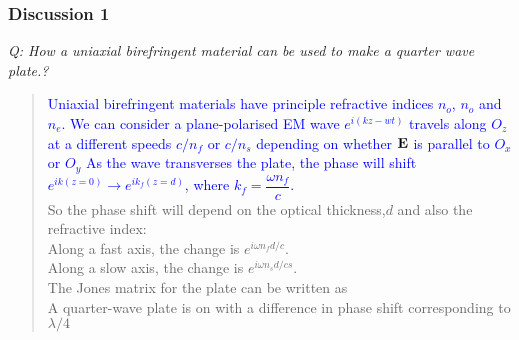 \documentclass[12pt,a4paper]{article}
\begin{document}
\subsubsection{Discussion 1}
    \textit{Q: How a uniaxial birefringent material can be used to make a quarter wave plate.?}\\
    \begin{quote}
    \textcolor{blue}{
    Uniaxial birefringent materials have principle refractive indices $n_o$, $n_o$ and $n_e$. 
    We can consider a plane-polarised EM wave $e^{i(kz-wt)}$ travels along $O_z$
    at a different speeds $c/n_f$ or $c/n_s$ depending on whether $\vb{E}$ is parallel to $O_x$ or $O_y$
    As the wave transverses the plate, the phase will shift $e^{ik(z=0)}\rightarrow e^{ik_f(z=d)}$,
    where $k_f=\dfrac{\omega n_f}{c}$.\\}
    So the phase shift will depend on the optical thickness,$d$ and also the refractive index:\\
    Along a fast axis, the change is $e^{i\omega n_f d/c}$.\\
    Along a slow axis, the change is $e^{i\omega n_s d/cs}$.\\
    The Jones matrix for the plate can be written as\\
    A quarter-wave plate is on with a difference in phase shift corresponding to $\lambda /4 $\\
    \end {quote}
\end{document}
